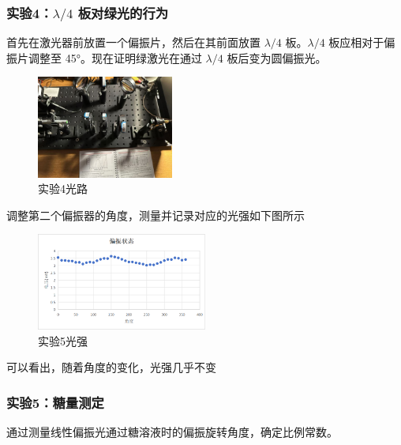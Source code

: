 \documentclass{ctexart}
\begin{document}
\subsubsection{实验4：$\lambda/4$ 板对绿光的行为}
首先在激光器前放置一个偏振片，然后在其前面放置 $\lambda/4$ 板。$\lambda/4$ 板应相对于偏振片调整至 45°。现在证明绿激光在通过 $\lambda/4$ 板后变为圆偏振光。
\begin{figure}[H]
    \centering
    \includegraphics[width=0.4\textwidth]{偏振光路.png}
    \caption{实验4光路}
\end{figure}
调整第二个偏振器的角度，测量并记录对应的光强如下图所示
\begin{figure}[H]
    \centering
    \includegraphics[width=0.5\textwidth]{实验5.png}
    \caption{实验5光强}
\end{figure}
可以看出，随着角度的变化，光强几乎不变

\subsubsection{实验5：糖量测定}
通过测量线性偏振光通过糖溶液时的偏振旋转角度，确定比例常数。
\end{document}
